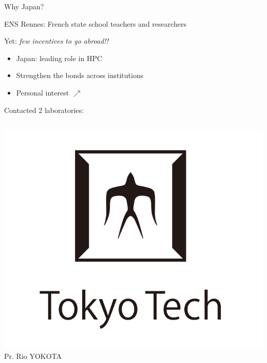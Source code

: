 \begin{frame}{Why Japan?}
	
	ENS Rennes: French state school teachers and researchers

	Yet: \emph{few incentives to go abroad!!}
	
	\begin{itemize}
		\item Japan: leading role in HPC
		\item Strengthen the bonds across institutions
		\item Personal interest $\nearrow$
	\end{itemize}


	\bigskip
	\centering
	Contacted 2 laboratories:
	
	\begin{columns}
	\includegraphics[width=1\textwidth]{tokyo_tech_logo}
 	Pr. Rio YOKOTA 
 	
 	\bigskip

 	\medskip
	

\end{columns}
\end{frame}
